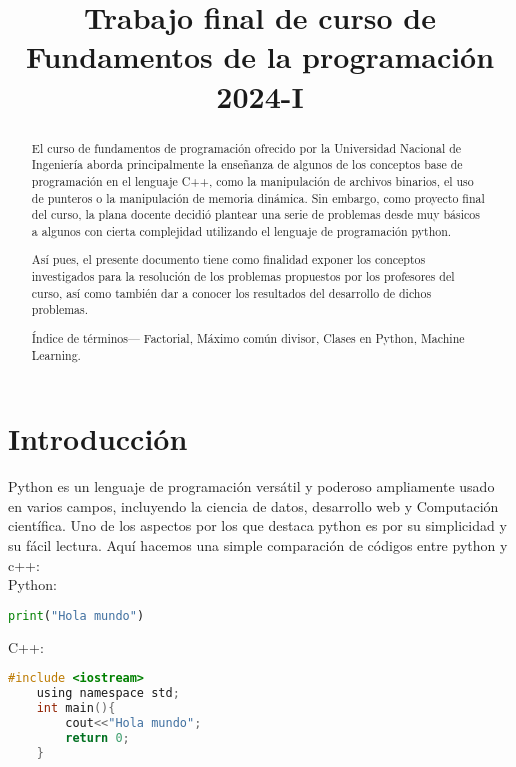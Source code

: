 \documentclass[conference]{IEEEtran}
\begin{document}
\title{\bf{Trabajo final de curso de Fundamentos de la programación 2024-I}}

\author{
\and
{}
}

\maketitle

\begin{abstract}
El curso de fundamentos de programación ofrecido por la Universidad Nacional de Ingeniería
aborda principalmente la enseñanza de algunos de los conceptos base de programación en el 
lenguaje C++, como la manipulación de archivos binarios, el uso de punteros o la manipulación
de memoria dinámica. Sin embargo, como proyecto final del curso, la plana docente decidió
plantear una serie de problemas desde muy básicos a algunos con cierta complejidad utilizando
el lenguaje de programación python.

Así pues, el presente documento tiene como finalidad exponer los conceptos
investigados para la resolución de los problemas propuestos por los profesores
del curso, así como también dar a conocer los resultados del desarrollo de dichos
problemas.
\vspace{0.2cm}


Índice de términos— Factorial, Máximo común divisor, Clases en Python, Machine Learning.
    
\end{abstract}

\section{Introducci\'on}
Python es un lenguaje de programación versátil y poderoso ampliamente usado
en varios campos, incluyendo la ciencia de datos, desarrollo web y Computación científica.
Uno de los aspectos por los que destaca python es por su simplicidad y su fácil lectura.
Aquí hacemos una simple comparación de códigos entre python y c++:
\\
Python:
\begin{lstlisting}[language=Python,basicstyle=\small,caption=Script de bienvenida en Python]
	print("Hola mundo")
\end{lstlisting}
\vspace{0.2cm}
C++:
\begin{lstlisting}[language=C,basicstyle=\small,caption=Script de bienvenida en C++]
	#include <iostream>
	using namespace std;
	int main(){
		cout<<"Hola mundo";
		return 0;
	}
\end{lstlisting}
\end{document}
